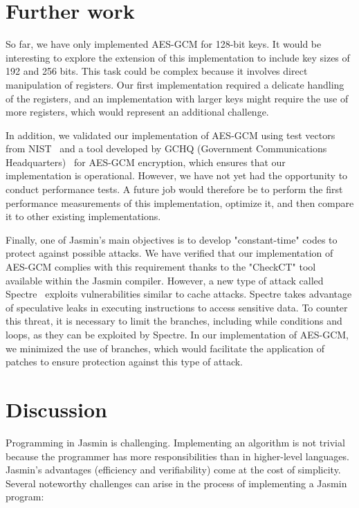 \documentclass[runningheads]{llncs}
\begin{document}
\section{Further work}

So far, we have only implemented AES-GCM for 128-bit keys. It would be interesting to explore the extension of this implementation to include key sizes of 192 and 256 bits. This task could be complex because it involves direct manipulation of registers. Our first implementation required a delicate handling of the registers, and an implementation with larger keys might require the use of more registers, which would represent an additional challenge.

In addition, we validated our implementation of AES-GCM using test vectors from NIST~\cite{GCM_NIST} and a tool developed by GCHQ (Government Communications Headquarters)~\cite{GCHQ_git} for AES-GCM encryption, which ensures that our implementation is operational. However, we have not yet had the opportunity to conduct performance tests. A future job would therefore be to perform the first performance measurements of this implementation, optimize it, and then compare it to other existing implementations.

Finally, one of Jasmin’s main objectives is to develop "constant-time" codes to protect against possible attacks. We have verified that our implementation of AES-GCM complies with this requirement thanks to the "CheckCT" tool available within the Jasmin compiler. However, a new type of attack called Spectre~\cite{spectre} exploits vulnerabilities similar to cache attacks. Spectre takes advantage of speculative leaks in executing instructions to access sensitive data. To counter this threat, it is necessary to limit the branches, including while conditions and loops, as they can be exploited by Spectre. In our implementation of AES-GCM, we minimized the use of branches, which would facilitate the application of patches to ensure protection against this type of attack.

\section{Discussion}

Programming in Jasmin is challenging. Implementing an algorithm is not trivial because the programmer has more responsibilities than in higher-level languages. Jasmin's advantages (efficiency and verifiability) come at the cost of simplicity. Several noteworthy challenges can arise in the process of implementing a Jasmin program:
\end{document}
